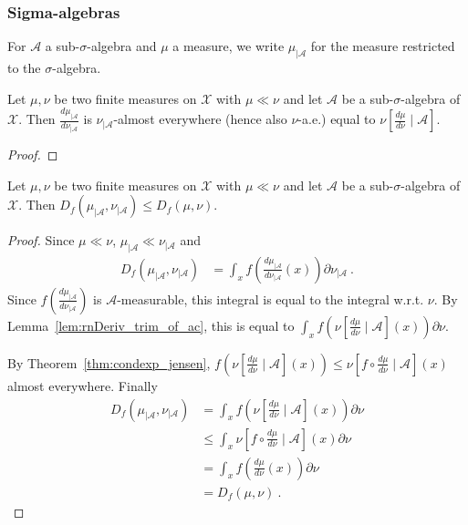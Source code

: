\subsubsection{Sigma-algebras}

For $\mathcal A$ a sub-$\sigma$-algebra and $\mu$ a measure, we write $\mathcal \mu_{| \mathcal A}$ for the measure restricted to the $\sigma$-algebra.

\begin{lemma}
  \label{lem:rnDeriv_trim_of_ac}
  \leanok
  Let $\mu, \nu$ be two finite measures on $\mathcal X$ with $\mu \ll \nu$ and let $\mathcal A$ be a sub-$\sigma$-algebra of $\mathcal X$.
  Then $\frac{d \mu_{| \mathcal A}}{d \nu_{| \mathcal A}}$ is $\nu_{| \mathcal A}$-almost everywhere (hence also $\nu$-a.e.) equal to $\nu\left[ \frac{d \mu}{d \nu} \mid \mathcal A\right]$.
\end{lemma}

\begin{proof}\leanok
\end{proof}

\begin{lemma}
  \label{lem:fDiv_trim_le_of_ac}
  \leanok
  Let $\mu, \nu$ be two finite measures on $\mathcal X$ with $\mu \ll \nu$ and let $\mathcal A$ be a sub-$\sigma$-algebra of $\mathcal X$. Then
  $D_f(\mu_{| \mathcal A}, \nu_{| \mathcal A}) \le D_f(\mu, \nu)$.
\end{lemma}

\begin{proof}\leanok
{}
Since $\mu \ll \nu$, $\mu_{| \mathcal A} \ll \nu_{| \mathcal A}$ and
\begin{align*}
D_f(\mu_{| \mathcal A}, \nu_{| \mathcal A})
&= \int_x f \left( \frac{d \mu_{| \mathcal A}}{d \nu_{| \mathcal A}}(x) \right) \partial\nu_{| \mathcal A} \: .
\end{align*}
Since $f \left( \frac{d \mu_{| \mathcal A}}{d \nu_{| \mathcal A}} \right)$ is $\mathcal A$-measurable, this integral is equal to the integral w.r.t. $\nu$.
By Lemma~\ref{lem:rnDeriv_trim_of_ac}, this is equal to $\int_x f \left( \nu\left[ \frac{d \mu}{d \nu} \mid \mathcal A\right] (x) \right) \partial\nu$.

By Theorem~\ref{thm:condexp_jensen}, $f \left( \nu\left[ \frac{d \mu}{d \nu} \mid \mathcal A\right] (x) \right) \le \nu\left[ f \circ \frac{d \mu}{d \nu} \mid \mathcal A\right] (x)$ almost everywhere.
Finally
\begin{align*}
D_f(\mu_{| \mathcal A}, \nu_{| \mathcal A})
&= \int_x f \left( \nu\left[ \frac{d \mu}{d \nu} \mid \mathcal A\right] (x) \right) \partial\nu
\\
&\le \int_x \nu\left[ f \circ \frac{d \mu}{d \nu} \mid \mathcal A\right] (x) \partial\nu
\\
&= \int_x f \left( \frac{d \mu}{d \nu} (x) \right) \partial\nu
\\
&= D_f(\mu, \nu)
\: .
\end{align*}

\end{proof}

